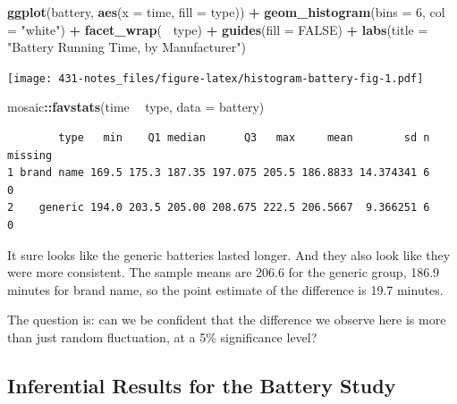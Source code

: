 \documentclass[
]{book}
\newenvironment{Shaded}{\begin{snugshade}}{\end{snugshade}}
\newcommand{\DataTypeTok}[1]{\textcolor[rgb]{0.13,0.29,0.53}{#1}}
\newcommand{\DecValTok}[1]{\textcolor[rgb]{0.00,0.00,0.81}{#1}}
\newcommand{\KeywordTok}[1]{\textcolor[rgb]{0.13,0.29,0.53}{\textbf{#1}}}
\newcommand{\NormalTok}[1]{#1}
\newcommand{\OperatorTok}[1]{\textcolor[rgb]{0.81,0.36,0.00}{\textbf{#1}}}
\newcommand{\OtherTok}[1]{\textcolor[rgb]{0.56,0.35,0.01}{#1}}
\newcommand{\StringTok}[1]{\textcolor[rgb]{0.31,0.60,0.02}{#1}}
\begin{document}
\begin{Shaded}
\begin{Highlighting}[]
\KeywordTok{ggplot}\NormalTok{(battery, }\KeywordTok{aes}\NormalTok{(}\DataTypeTok{x =}\NormalTok{ time, }\DataTypeTok{fill =}\NormalTok{ type)) }\OperatorTok{+}
\StringTok{  }\KeywordTok{geom_histogram}\NormalTok{(}\DataTypeTok{bins =} \DecValTok{6}\NormalTok{, }\DataTypeTok{col =} \StringTok{"white"}\NormalTok{) }\OperatorTok{+}
\StringTok{  }\KeywordTok{facet_wrap}\NormalTok{(}\OperatorTok{~}\StringTok{ }\NormalTok{type) }\OperatorTok{+}
\StringTok{  }\KeywordTok{guides}\NormalTok{(}\DataTypeTok{fill =} \OtherTok{FALSE}\NormalTok{) }\OperatorTok{+}\StringTok{ }
\StringTok{  }\KeywordTok{labs}\NormalTok{(}\DataTypeTok{title =} \StringTok{"Battery Running Time, by Manufacturer"}\NormalTok{)}
\end{Highlighting}
\end{Shaded}

\texttt{[image: 431-notes\_files/figure-latex/histogram-battery-fig-1.pdf]}

\begin{Shaded}
\begin{Highlighting}[]
\NormalTok{mosaic}\OperatorTok{::}\KeywordTok{favstats}\NormalTok{(time }\OperatorTok{~}\StringTok{ }\NormalTok{type, }\DataTypeTok{data =}\NormalTok{ battery)}
\end{Highlighting}
\end{Shaded}

\begin{verbatim}
        type   min    Q1 median      Q3   max     mean        sd n missing
1 brand name 169.5 175.3 187.35 197.075 205.5 186.8833 14.374341 6       0
2    generic 194.0 203.5 205.00 208.675 222.5 206.5667  9.366251 6       0
\end{verbatim}

It sure looks like the generic batteries lasted longer. And they also look like they were more consistent. The sample means are 206.6 for the generic group, 186.9 minutes for brand name, so the point estimate of the difference is 19.7 minutes.

The question is: can we be confident that the difference we observe here is more than just random fluctuation, at a 5\% significance level?

\hypertarget{inferential-results-for-the-battery-study}{%
\subsection{Inferential Results for the Battery Study}\label{inferential-results-for-the-battery-study}}
\end{document}
